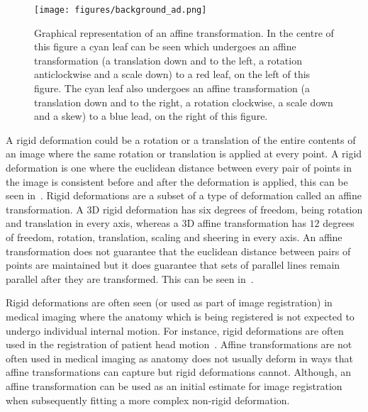                 \begin{figure}
                    \centering
                    
                    \texttt{[image: figures/background\_ad.png]}
                    
                    \captionsetup{singlelinecheck=false}
                    \caption{
                        Graphical representation of an affine transformation. In the centre of this figure a cyan leaf can be seen which undergoes an affine transformation (a translation down and to the left, a rotation anticlockwise and a scale down) to a red leaf, on the left of this figure. The cyan leaf also undergoes an affine transformation (a translation down and to the right, a rotation clockwise, a scale down and a skew) to a blue lead, on the right of this figure.
                    }
                    \label{fig:rigid_transformations_ad}
                \end{figure}
                
                A rigid deformation could be a rotation or a translation of the entire contents of an image where the same rotation or translation is applied at every point. A rigid deformation is one where the euclidean distance between every pair of points in the image is consistent before and after the deformation is applied, this can be seen in~. Rigid deformations are a subset of a type of deformation called an affine transformation. A \gls{3D} rigid deformation has six degrees of freedom, being rotation and translation in every axis, whereas a \gls{3D} affine transformation has $12$ degrees of freedom, rotation, translation, scaling and sheering in every axis. An affine transformation does not guarantee that the euclidean distance between pairs of points are maintained but it does guarantee that sets of parallel lines remain parallel after they are transformed. This can be seen in~.
                
                Rigid deformations are often seen (or used as part of image registration) in medical imaging where the anatomy which is being registered is not expected to undergo individual internal motion. For instance, rigid deformations are often used in the registration of patient head motion~\parencite{Hill2001}. Affine transformations are not often used in medical imaging as anatomy does not usually deform in ways that affine transformations can capture but rigid deformations cannot. Although, an affine transformation can be used as an initial estimate for image registration when subsequently fitting a more complex non-rigid deformation.
                

